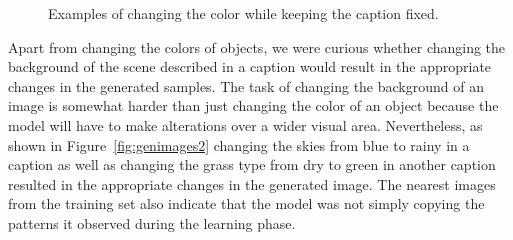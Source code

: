 \documentclass{article} %
\begin{document}
\begin{figure}[!h]
\captionsetup[subfigure]{labelformat=empty}
\begin{center}
\quad
%
\quad
%
\quad
%
\quad
%
\end{center}
\caption{Examples of changing the color while keeping the caption fixed.}
\label{fig:genimages1}
\vspace{-0.3cm}
\end{figure}

Apart from changing the colors of objects, we were curious whether changing the background of the scene described in a caption would result in the appropriate changes in the generated samples. The task of changing the background of an image is somewhat harder than just changing the color of an object because the model will have to make alterations over a wider visual area. Nevertheless, as shown in Figure~\ref{fig:genimages2} changing the skies from blue to rainy in a caption as well as changing the grass type from dry to green in another caption resulted in the appropriate changes in the generated image. The nearest images from the training set also indicate that the model was not simply copying the patterns it observed during the learning phase.
\end{document}
